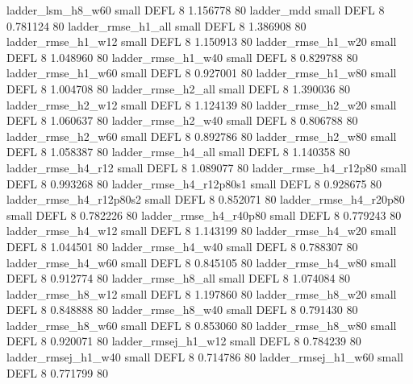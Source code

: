        ladder_lsm_h8_w60      small     DEFL                 8 1.156778 80
              ladder_mdd      small     DEFL                 8 0.781124 80
      ladder_rmse_h1_all      small     DEFL                 8 1.386908 80
      ladder_rmse_h1_w12      small     DEFL                 8 1.150913 80
      ladder_rmse_h1_w20      small     DEFL                 8 1.048960 80
      ladder_rmse_h1_w40      small     DEFL                 8 0.829788 80
      ladder_rmse_h1_w60      small     DEFL                 8 0.927001 80
      ladder_rmse_h1_w80      small     DEFL                 8 1.004708 80
      ladder_rmse_h2_all      small     DEFL                 8 1.390036 80
      ladder_rmse_h2_w12      small     DEFL                 8 1.124139 80
      ladder_rmse_h2_w20      small     DEFL                 8 1.060637 80
      ladder_rmse_h2_w40      small     DEFL                 8 0.806788 80
      ladder_rmse_h2_w60      small     DEFL                 8 0.892786 80
      ladder_rmse_h2_w80      small     DEFL                 8 1.058387 80
      ladder_rmse_h4_all      small     DEFL                 8 1.140358 80
      ladder_rmse_h4_r12      small     DEFL                 8 1.089077 80
   ladder_rmse_h4_r12p80      small     DEFL                 8 0.993268 80
 ladder_rmse_h4_r12p80s1      small     DEFL                 8 0.928675 80
 ladder_rmse_h4_r12p80s2      small     DEFL                 8 0.852071 80
   ladder_rmse_h4_r20p80      small     DEFL                 8 0.782226 80
   ladder_rmse_h4_r40p80      small     DEFL                 8 0.779243 80
      ladder_rmse_h4_w12      small     DEFL                 8 1.143199 80
      ladder_rmse_h4_w20      small     DEFL                 8 1.044501 80
      ladder_rmse_h4_w40      small     DEFL                 8 0.788307 80
      ladder_rmse_h4_w60      small     DEFL                 8 0.845105 80
      ladder_rmse_h4_w80      small     DEFL                 8 0.912774 80
      ladder_rmse_h8_all      small     DEFL                 8 1.074084 80
      ladder_rmse_h8_w12      small     DEFL                 8 1.197860 80
      ladder_rmse_h8_w20      small     DEFL                 8 0.848888 80
      ladder_rmse_h8_w40      small     DEFL                 8 0.791430 80
      ladder_rmse_h8_w60      small     DEFL                 8 0.853060 80
      ladder_rmse_h8_w80      small     DEFL                 8 0.920071 80
     ladder_rmsej_h1_w12      small     DEFL                 8 0.784239 80
     ladder_rmsej_h1_w40      small     DEFL                 8 0.714786 80
     ladder_rmsej_h1_w60      small     DEFL                 8 0.771799 80
